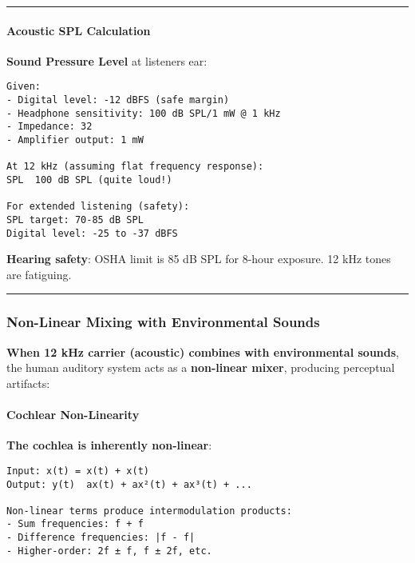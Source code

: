 \begin{center}\rule{0.5\linewidth}{0.5pt}\end{center}

\paragraph{Acoustic SPL Calculation}\label{acoustic-spl-calculation}

\textbf{Sound Pressure Level} at listener\textquotesingle s ear:

\begin{verbatim}
Given:
- Digital level: -12 dBFS (safe margin)
- Headphone sensitivity: 100 dB SPL/1 mW @ 1 kHz
- Impedance: 32 
- Amplifier output: 1 mW

At 12 kHz (assuming flat frequency response):
SPL  100 dB SPL (quite loud!)

For extended listening (safety):
SPL target: 70-85 dB SPL
Digital level: -25 to -37 dBFS
\end{verbatim}

\textbf{Hearing safety}: OSHA limit is 85 dB SPL for 8-hour exposure. 12
kHz tones are fatiguing.

\begin{center}\rule{0.5\linewidth}{0.5pt}\end{center}

\subsubsection{Non-Linear Mixing with Environmental
Sounds}\label{non-linear-mixing-with-environmental-sounds}

\textbf{When 12 kHz carrier (acoustic) combines with environmental
sounds}, the human auditory system acts as a \textbf{non-linear mixer},
producing perceptual artifacts:

\paragraph{Cochlear Non-Linearity}\label{cochlear-non-linearity}

\textbf{The cochlea is inherently non-linear}:

\begin{verbatim}
Input: x(t) = x(t) + x(t)
Output: y(t)  ax(t) + ax²(t) + ax³(t) + ...

Non-linear terms produce intermodulation products:
- Sum frequencies: f + f
- Difference frequencies: |f - f|
- Higher-order: 2f ± f, f ± 2f, etc.
\end{verbatim}

